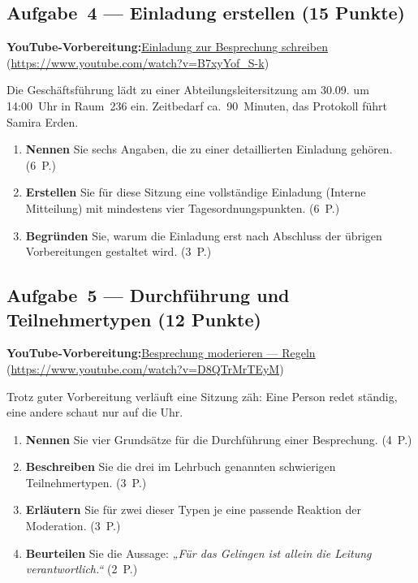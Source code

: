 \documentclass[11pt, a4paper]{article}
\begin{document}
\subsection*{Aufgabe~4 --- Einladung erstellen (15 Punkte)}

\noindent\textbf{\color{bfwAccent}YouTube-Vorbereitung:}\enspace \href{https://www.youtube.com/watch?v=B7xyYof_S-k}{Einladung zur Besprechung schreiben} (\url{https://www.youtube.com/watch?v=B7xyYof_S-k})

\medskip
Die Geschäftsführung lädt zu einer Abteilungsleitersitzung am 30.09. um 14:00~Uhr in Raum~236
ein. Zeitbedarf ca.\ 90~Minuten, das Protokoll führt Samira Erden.

\begin{enumerate}[label=(\alph*)]
  \item \textbf{Nennen} Sie sechs Angaben, die zu einer detaillierten Einladung gehören. \hfill (6~P.)
  \item \textbf{Erstellen} Sie für diese Sitzung eine vollständige Einladung (Interne Mitteilung) mit mindestens vier Tagesordnungspunkten. \hfill (6~P.)
  \item \textbf{Begründen} Sie, warum die Einladung erst nach Abschluss der übrigen Vorbereitungen gestaltet wird. \hfill (3~P.)
\end{enumerate}

\subsection*{Aufgabe~5 --- Durchführung und Teilnehmertypen (12 Punkte)}

\noindent\textbf{\color{bfwAccent}YouTube-Vorbereitung:}\enspace \href{https://www.youtube.com/watch?v=D8QTrMrTEyM}{Besprechung moderieren --- Regeln} (\url{https://www.youtube.com/watch?v=D8QTrMrTEyM})

\medskip
Trotz guter Vorbereitung verläuft eine Sitzung zäh: Eine Person redet ständig, eine andere
schaut nur auf die Uhr.

\begin{enumerate}[label=(\alph*)]
  \item \textbf{Nennen} Sie vier Grundsätze für die Durchführung einer Besprechung. \hfill (4~P.)
  \item \textbf{Beschreiben} Sie die drei im Lehrbuch genannten schwierigen Teilnehmertypen. \hfill (3~P.)
  \item \textbf{Erläutern} Sie für zwei dieser Typen je eine passende Reaktion der Moderation. \hfill (3~P.)
  \item \textbf{Beurteilen} Sie die Aussage: \emph{„Für das Gelingen ist allein die Leitung verantwortlich.“} \hfill (2~P.)
\end{enumerate}
\end{document}

